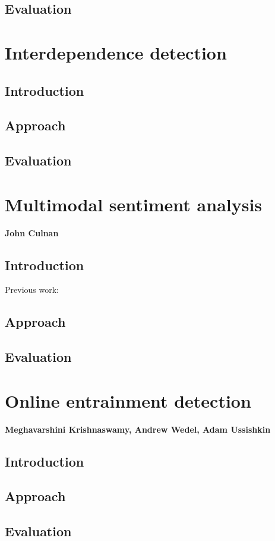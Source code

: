 \documentclass[oneside,9pt]{memoir}
\begin{document}
\section{Evaluation}

\chapter{Interdependence detection}
\section{Introduction}
\section{Approach}
\section{Evaluation}

\chapter{Multimodal sentiment analysis}
\textbf{John Culnan}
\section{Introduction}
Previous work: \cite{culnan-etal-2021-ire}
\section{Approach}
\section{Evaluation}

\chapter{Online entrainment detection}
\textbf{Meghavarshini Krishnaswamy, Andrew Wedel, Adam Ussishkin}
\section{Introduction}
\section{Approach}
\section{Evaluation}
\end{document}
